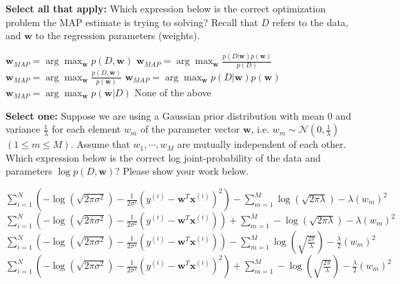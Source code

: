 \documentclass[11pt,addpoints,answers]{exam}
\newcommand{\sall}{\textbf{Select all that apply: }}
\newcommand{\sone}{\textbf{Select one: }}
\begin{document}
\begin{questions}
\begin{parts}
    \begin{subparts}
    \subpart[3] \sall Which expression below is the correct optimization problem the MAP estimate is trying to solving? Recall that $D$ refers to the data, and $\mathbf{w}$ to the regression parameters (weights).
    {\checkboxchar{$\Box$} \checkedchar{$\blacksquare$}
    \begin{checkboxes}
        \CorrectChoice $\mathbf{w}_{MAP} = \arg\max_{\mathbf{w}} p(D, \mathbf{w})$
        \CorrectChoice $\mathbf{w}_{MAP} = \arg\max_{\mathbf{w}} \frac{p(D| \mathbf{w})p(\mathbf{w})}{p(D)}$
        \choice $\mathbf{w}_{MAP} = \arg\max_{\mathbf{w}} \frac{p(D, \mathbf{w})}{p(\mathbf{w})}$
        \CorrectChoice $\mathbf{w}_{MAP} = \arg\max_{\mathbf{w}} p(D| \mathbf{w})p(\mathbf{w})$
        \CorrectChoice $\mathbf{w}_{MAP} = \arg\max_{\mathbf{w}} p(\mathbf{w}| D)$
        \choice None of the above
    \end{checkboxes}
    }
    

    \subpart[3] \sone Suppose we are using a Gaussian prior distribution with mean $0$ and variance $\frac{1}{\lambda}$ for each element $w_m$  of the parameter vector $\mathbf{w}$, i.e. $w_m \sim \mathcal{N}\left(0, \frac{1}{\lambda}\right)$ $(1 \leq m \leq M )$. Assume that $w_1, \cdots, w_M$ are mutually independent of each other. Which expression below is the correct log joint-probability of the data and parameters $\log p(D, \mathbf{w})$?  Please show your work below.
    \begin{checkboxes}
        \choice $\sum_{i=1}^N\left(-\log (\sqrt{2\pi\sigma^2}) - \frac{1}{2\sigma^2} (y^{(i)} - \mathbf{w}^T\mathbf{x}^{(i)})^2\right) - \sum_{m=1}^M \log(\sqrt{2\pi\lambda}) - \lambda (w_m)^2$
        \choice $\sum_{i=1}^N\left(-\log (\sqrt{2\pi\sigma^2}) - \frac{1}{2\sigma^2} (y^{(i)} - \mathbf{w}^T\mathbf{x}^{(i)})\right) + \sum_{m=1}^M -\log(\sqrt{2\pi\lambda}) - \lambda (w_m)^2$
        \choice $\sum_{i=1}^N\left(-\log (\sqrt{2\pi\sigma^2}) - \frac{1}{2\sigma^2} (y^{(i)} - \mathbf{w}^T\mathbf{x}^{(i)})\right) -  \sum_{m=1}^M \log(\sqrt{\frac{2\pi}{\lambda}}) - \frac{\lambda}{2}(w_m)^2$
        \CorrectChoice $\sum_{i=1}^N\left(-\log (\sqrt{2\pi\sigma^2}) - \frac{1}{2\sigma^2} (y^{(i)} - \mathbf{w}^T\mathbf{x}^{(i)})^2\right) +  \sum_{m=1}^M -\log(\sqrt{\frac{2\pi}{\lambda}}) - \frac{\lambda}{2}(w_m)^2$
    \end{checkboxes}
    

\end{subparts}
\end{parts}
\end{questions}
\end{document}
